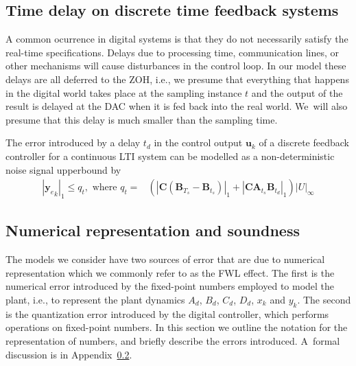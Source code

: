 \documentclass[sigconf]{llncs}
\newcommand{\mat}[1]{\boldsymbol{#1}}
\renewcommand{\vec}[1]{\boldsymbol{#1}}
\begin{document}
\subsection{Time delay on discrete time feedback systems} \label{sec:delay}
A common ocurrence in digital systems is that they do not necessarily
satisfy the real-time specifications.  Delays due to processing time,
communication lines, or other mechanisms will cause disturbances in the
control loop.  In our model these delays are all deferred to the ZOH, i.e.,
we presume that everything that happens in the digital world takes place at
the sampling instance $t$ and the output of the result is delayed at the DAC
when it is fed back into the real world.  We~will also presume that this
delay is much smaller than the sampling time.

\begin{theorem}
The error introduced by a delay $t_d$ in the control output $\vec{u}_k$ of a discrete feedback controller for a continuous LTI system can be modelled as a non-deterministic noise signal upperbound by 
\begin{align}
|{\vec{y}_e}_{k}|_1 \leq q_t, \text{ where } q_t=&(|\mat{C}(\mat{B}_{T_s}-\mat{B}_{t_s})|_1+|\mat{C}\mat{A}_{t_s}\mat{B}_{t_d}|_1)|U|_\infty
\end{align}
\end{theorem}

\subsection{Numerical representation and soundness} 
\label{sec:numeric_rep}

The models we consider have two sources of error that are due to numerical  
representation which we commonly refer to as the FWL effect.
The first is the numerical error introduced by the
fixed-point numbers employed to model the plant, i.e., to represent the
plant dynamics $A_d$, $B_d$, $C_d$, $D_d$, $x_k$ and $y_k$.
The second is the quantization error
introduced by the digital controller, which performs operations on
fixed-point numbers.  In this section we outline the notation for the
representation of numbers, and briefly describe the errors
introduced.  A~formal discussion is in
Appendix~\ref{sec:numeric_rep}.
\end{document}
